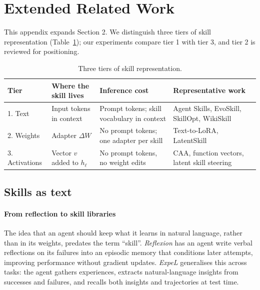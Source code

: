 \documentclass[11pt]{article}
\begin{document}


\appendix

\section{Extended Related Work}
\label{app:related}

This appendix expands Section 2. We distinguish three tiers of skill representation
(Table~\ref{tab:tiers}); our experiments compare tier 1 with tier 3, and tier 2 is reviewed for
positioning.

\begin{table}[t]
\centering\small
\begin{tabular}{@{}p{1.9cm}p{3.4cm}p{4.4cm}p{4.9cm}@{}}
\toprule
Tier & Where the skill lives & Inference cost & Representative work \\
\midrule
1. Text & Input tokens in context & Prompt tokens; skill vocabulary in context & Agent Skills, EvoSkill, SkillOpt, WikiSkill \\
2. Weights & Adapter $\Delta W$ & No prompt tokens; one adapter per skill & Text-to-LoRA, LatentSkill \\
3. Activations & Vector $v$ added to $h_\ell$ & No prompt tokens, no weight edits & CAA, function vectors, latent skill steering \\
\bottomrule
\end{tabular}
\caption{Three tiers of skill representation.}
\label{tab:tiers}
\end{table}

\subsection{Skills as text}

\paragraph{From reflection to skill libraries} The idea that an agent should keep what it learns in
natural language, rather than in its weights, predates the term ``skill''. \emph{Reflexion}
\citep{shinn2023reflexion} has an agent write verbal reflections on its failures into an episodic
memory that conditions later attempts, improving performance without gradient updates.
\emph{ExpeL} \citep{zhao2024expel} generalises this across tasks: the agent gathers experiences,
extracts natural-language insights from successes and failures, and recalls both insights and
trajectories at test time.
\end{document}
